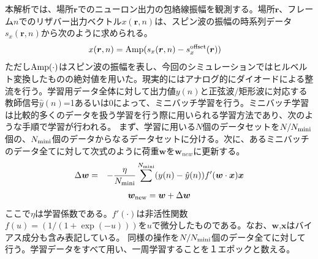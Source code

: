 \documentclass[a4j, twocolumn]{jsarticle}
\begin{document}
本解析では、場所$\bm{r}$でのニューロン出力の包絡線振幅を観測する。場所$\bm{r}$、フレーム$n$でのリザバー出力ベクトル$x(\bm{r},n)$は、スピン波の振幅の時系列データ$s_{x}(\bm{r},n)$から次のように求められる。
%
\begin{eqnarray}
\hspace*{-1em} 
x(\bm{r}, n)
=
{\rm Amp} (s_{x}(\bm{r}, n)-s_{x}^{\rm offset}(\bm{r}))
\label{eq:yn} 
\end{eqnarray}
ただし${\rm Amp}(\cdot)$はスピン波の振幅を表し、今回のシミュレーションではヒルベルト変換したものの絶対値を用いた。現実的にはアナログ的にダイオードによる整流を行う。学習用データ全体に対して出力値$y ( n )$と正弦波/矩形波に対応する教師信号$\hat{y} ( n )$=1あるいは0によって、ミニバッチ学習を行う。ミニバッチ学習は比較的多くのデータを扱う学習を行う際に用いられる学習方法であり、次のような手順で学習が行われる。
%
まず、学習に用いる$N$個のデータセットを$N/N_{\rm mini}$個の、$N_{\rm mini}$個のデータからなるデータセットに分ける。次に、あるミニバッチのデータ全てに対して次式のように荷重$\bm w$を$\bm w_{new}$に更新する。
\begin{eqnarray}
\Delta \bm{w} &=& - \frac{\eta}{N_{\rm mini}} \sum^{N_{\rm mini}} ( y ( n ) - \hat{y} ( n ) ) f'( \bm{w} \cdot {\bm{x}} ) \bm{x}
\label{eq:Deltabmw1}
\end{eqnarray}
\begin{eqnarray}
\bm{w}_{\rm new} = \bm{w} + \Delta \bm{w}
\label{eq:Deltabmw2}
\end{eqnarray}
ここで$\eta$は学習係数である。$f'(\cdot)$は非活性関数$f ( u ) = (1/(1+\exp(-u)))$を$u$で微分したものである。なお、$\bm{w}$,$\bm{x}$はバイアス成分も含み表記している。
同様の操作を$N/N_{\rm mini}$個のデータ全てに対して行う。学習データをすべて用い、一周学習することを１エポックと数える。
\end{document}
